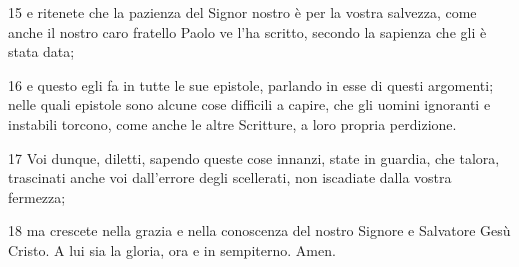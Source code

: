 \par 15 e ritenete che la pazienza del Signor nostro è per la vostra salvezza, come anche il nostro caro fratello Paolo ve l'ha scritto, secondo la sapienza che gli è stata data;
\par 16 e questo egli fa in tutte le sue epistole, parlando in esse di questi argomenti; nelle quali epistole sono alcune cose difficili a capire, che gli uomini ignoranti e instabili torcono, come anche le altre Scritture, a loro propria perdizione.
\par 17 Voi dunque, diletti, sapendo queste cose innanzi, state in guardia, che talora, trascinati anche voi dall'errore degli scellerati, non iscadiate dalla vostra fermezza;
\par 18 ma crescete nella grazia e nella conoscenza del nostro Signore e Salvatore Gesù Cristo. A lui sia la gloria, ora e in sempiterno. Amen.


